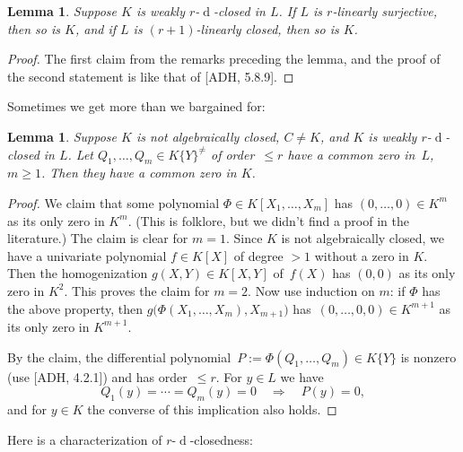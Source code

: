 \documentclass[]{amsart}
\numberwithin{equation}{section}
\def \d{\operatorname{d}}
\newtheorem{lemma}[theorem]{Lemma}
\theoremstyle{definition}
\theoremstyle{remark}
\renewcommand\leq{\leqslant}
\renewcommand\geq{\geqslant}
\renewcommand\ge{\geq}
\begin{document}
\begin{lemma}\label{lem:weakly r-d-closed}
Suppose $K$ is weakly $r$-$\d$-closed in $L$. If $L$ is $r$-linearly surjective, then so is $K$, and if $L$
is
$(r+1)$-linearly closed, then so is $K$.
\end{lemma}
\begin{proof}
The first claim from the remarks preceding the lemma, and the proof of the second statement is like that of  [ADH, 5.8.9].
\end{proof}


\noindent
Sometimes we get more than we bargained for:

\begin{lemma}
Suppose $K$ is not algebraically closed, $C\ne K$, and
$K$ is weakly $r$-$\d$-closed in $L$. Let $Q_1,\dots,Q_m\in K\{Y\}^{\neq}$ of order~$\leq r$ have a common zero
in~$L$,~$m\ge 1$. Then they have a common zero in $K$.
\end{lemma}
\begin{proof}
We claim that some polynomial $\Phi\in K[X_1,\dots,X_m]$ has $(0,\dots,0)\in K^m$ as its only
zero in $K^m$.
(This is folklore, but we didn't find a proof in the literature.)
The claim is clear for $m=1$. Since $K$ is not algebraically closed, we have a univariate polynomial $f\in K[X]$ of degree $>1$ 
 without a zero in $K$. %
Then the homogenization  $g(X,Y)\in K[X,Y]$
 of~$f(X)$ has $(0,0)$ as its only zero in $K^2$. 
This proves the claim for $m=2$. Now use induction on $m$: if $\Phi$ has the above property, then
 $g\big(\Phi(X_1, \ldots, X_{m}), X_{m+1}\big)$ has~$(0,\dots, 0,0)\in K^{m+1}$ as its only zero in $K^{m+1}$.


By the claim, the differential
polynomial~$P:=\Phi(Q_1,\dots,Q_m)\in K\{Y\}$ is nonzero (use [ADH, 4.2.1]) and
has order~$\leq r$. For $y\in L$ we have $$Q_1(y)=\cdots=Q_m(y)=0\quad \Longrightarrow\quad P(y)=0,$$
and for $y\in K$ the converse of this implication also holds. %
\end{proof}

\noindent
Here is a characterization of $r$-$\d$-closedness:
\end{document}
